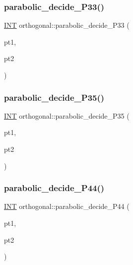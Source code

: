 \subsubsection{\texorpdfstring{parabolic\+\_\+decide\+\_\+\+P33()}{parabolic\_decide\_P33()}}
{\footnotesize\ttfamily \mbox{\hyperlink{galois_8h_a09fddde158a3a20bd2dcadb609de11dc}{I\+NT}} orthogonal\+::parabolic\+\_\+decide\+\_\+\+P33 (\begin{DoxyParamCaption}\item[{\mbox{\hyperlink{galois_8h_a09fddde158a3a20bd2dcadb609de11dc}{I\+NT}}}]{pt1,  }\item[{\mbox{\hyperlink{galois_8h_a09fddde158a3a20bd2dcadb609de11dc}{I\+NT}}}]{pt2 }\end{DoxyParamCaption})}

\mbox{\label{classorthogonal_a6f9b23e5b47b2864052ee6e66775c904}} 
\subsubsection{\texorpdfstring{parabolic\+\_\+decide\+\_\+\+P35()}{parabolic\_decide\_P35()}}
{\footnotesize\ttfamily \mbox{\hyperlink{galois_8h_a09fddde158a3a20bd2dcadb609de11dc}{I\+NT}} orthogonal\+::parabolic\+\_\+decide\+\_\+\+P35 (\begin{DoxyParamCaption}\item[{\mbox{\hyperlink{galois_8h_a09fddde158a3a20bd2dcadb609de11dc}{I\+NT}}}]{pt1,  }\item[{\mbox{\hyperlink{galois_8h_a09fddde158a3a20bd2dcadb609de11dc}{I\+NT}}}]{pt2 }\end{DoxyParamCaption})}

\mbox{\label{classorthogonal_a921eec6bede3574fd47497377a82c252}} 
\subsubsection{\texorpdfstring{parabolic\+\_\+decide\+\_\+\+P44()}{parabolic\_decide\_P44()}}
{\footnotesize\ttfamily \mbox{\hyperlink{galois_8h_a09fddde158a3a20bd2dcadb609de11dc}{I\+NT}} orthogonal\+::parabolic\+\_\+decide\+\_\+\+P44 (\begin{DoxyParamCaption}\item[{\mbox{\hyperlink{galois_8h_a09fddde158a3a20bd2dcadb609de11dc}{I\+NT}}}]{pt1,  }\item[{\mbox{\hyperlink{galois_8h_a09fddde158a3a20bd2dcadb609de11dc}{I\+NT}}}]{pt2 }\end{DoxyParamCaption})}


